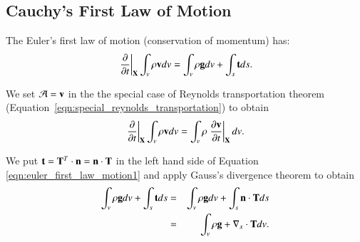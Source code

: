 
\subsection{Cauchy's First Law of Motion}

The Euler's first law of motion (conservation of momentum) has:
\begin{equation}
\label{eqn:euler_first_law_motion1}
\left.\frac{\partial}{\partial{t}}\right|_{\mathbf{X}}\int_v \rho {\mathbf{v}} dv		
=\int_v \rho {\mathbf{g}} dv + \int_s {\mathbf{t}} ds.
\end{equation}

We set $\mathcal{A}=\mathbf{v}$ in the the special case of Reynolds transportation theorem (Equation~\eqref{eqn:special_reynolds_transportation}) to obtain
%
\begin{equation}
\label{eqn:cauchy_first_law1}
\left.\frac{\partial}{\partial{t}}\right|_{\mathbf{X}} \int_v \rho {\mathbf{v}} dv 	
=\int_v \rho \left.\frac{\partial\mathbf{v}}{\partial{t}}\right|_{\mathbf{X}} dv.
\end{equation}

We put ${\bf{t}}={\mathbf{T}}^{T}\cdot{\mathbf{n}}={\mathbf{n}}\cdot{\mathbf{T}}$
in the left hand side of Equation \eqref{eqn:euler_first_law_motion1} and apply Gauss's divergence theorem to obtain
%
\begin{eqnarray}
\int_v \rho {\mathbf{g}} dv + \int_s {\mathbf{t}} ds
&=&\int_v \rho {\mathbf{g}} dv + \int_s {\mathbf{n}} \cdot {\mathbf{T}} ds \\
\label{eqn:cauchy_first_law2}
&=&\int_v \rho {\mathbf{g}} + \nabla_x \cdot {\mathbf{T}} dv.
\end{eqnarray}

